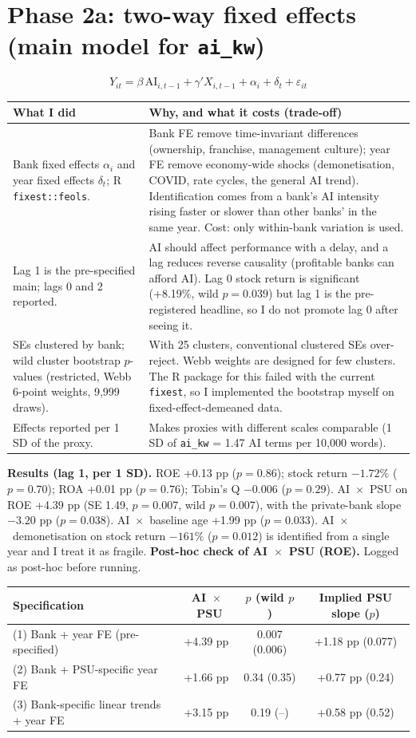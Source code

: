 \documentclass[10.5pt,a4paper]{article}
\newcommand{\var}[1]{\texttt{#1}}
\newenvironment{decisions}{%
  \begin{longtable}{L{0.36\textwidth} L{0.58\textwidth}}
  \toprule
  \textcolor{head}{\textbf{What I did}} & \textcolor{head}{\textbf{Why, and what it costs (trade-off)}}\\
  \midrule\endhead}{%
  \end{longtable}}
\newcommand{\row}[2]{#1 & #2\\ \midrule}
\begin{document}
\section{Phase 2a: two-way fixed effects (main model for \var{ai\_kw})}
\[ Y_{it} = \beta\,\text{AI}_{i,t-1} + \gamma' X_{i,t-1} + \alpha_i + \delta_t + \varepsilon_{it} \]
\begin{decisions}
\row{Bank fixed effects $\alpha_i$ and year fixed effects $\delta_t$; R \var{fixest::feols}.}
{Bank FE remove time-invariant differences (ownership, franchise, management culture); year FE remove economy-wide
shocks (demonetisation, COVID, rate cycles, the general AI trend). Identification comes from a bank's AI intensity
rising faster or slower than other banks' in the same year. Cost: only within-bank variation is used.}
\row{Lag 1 is the pre-specified main; lags 0 and 2 reported.}
{AI should affect performance with a delay, and a lag reduces reverse causality (profitable banks can afford AI). Lag 0
stock return is significant (+8.19\%, wild $p=0.039$) but lag 1 is the pre-registered headline, so I do not promote
lag 0 after seeing it.}
\row{SEs clustered by bank; wild cluster bootstrap $p$-values (restricted, Webb 6-point weights, 9,999 draws).}
{With 25 clusters, conventional clustered SEs over-reject. Webb weights are designed for few clusters. The R package
for this failed with the current \var{fixest}, so I implemented the bootstrap myself on fixed-effect-demeaned data.}
\row{Effects reported per 1 SD of the proxy.}
{Makes proxies with different scales comparable (1 SD of \var{ai\_kw} = 1.47 AI terms per 10,000 words).}
\end{decisions}
\textbf{Results (lag 1, per 1 SD).} ROE +0.13 pp ($p=0.86$); stock return $-1.72\%$ ($p=0.70$); ROA +0.01 pp
($p=0.76$); Tobin's Q $-0.006$ ($p=0.29$). AI~$\times$~PSU on ROE +4.39 pp (SE 1.49, $p=0.007$, wild $p=0.007$), with the
private-bank slope $-3.20$ pp ($p=0.038$). AI~$\times$~baseline age +1.99 pp ($p=0.033$). AI~$\times$~demonetisation on
stock return $-161\%$ ($p=0.012$) is identified from a single year and I treat it as fragile.
\textbf{Post-hoc check of AI~$\times$~PSU (ROE).} Logged as post-hoc before running.
\begin{center}\small
\begin{tabular}{lccc}
\toprule
Specification & AI~$\times$~PSU & $p$ (wild $p$) & Implied PSU slope ($p$)\\
\midrule
(1) Bank + year FE (pre-specified) & +4.39 pp & 0.007 (0.006) & +1.18 pp (0.077)\\
(2) Bank + PSU-specific year FE & +1.66 pp & 0.34 (0.35) & +0.77 pp (0.24)\\
(3) Bank-specific linear trends + year FE & +3.15 pp & 0.19 (--) & +0.58 pp (0.52)\\
\bottomrule
\end{tabular}
\end{center}
\end{document}
